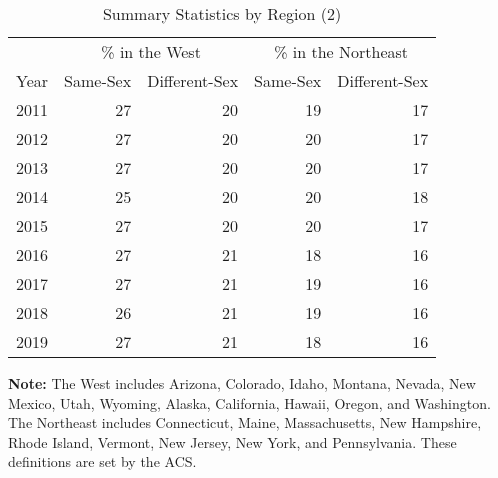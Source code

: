 \begin{table}[htbp]

\caption{Summary Statistics by Region (2)}
\label{region_2} %
\centering
\begin{tabular}[t]{rrrrr}
\toprule
\multicolumn{1}{c}{ } & \multicolumn{2}{c}{\% in the West} & \multicolumn{2}{c}{\% in the Northeast} \\
\cmidrule(l{3pt}r{3pt}){2-3} \cmidrule(l{3pt}r{3pt}){4-5}
Year & Same-Sex & Different-Sex & Same-Sex & Different-Sex\\
\midrule
2011 & 27 & 20 & 19 & 17\\
2012 & 27 & 20 & 20 & 17\\
2013 & 27 & 20 & 20 & 17\\
2014 & 25 & 20 & 20 & 18\\
2015 & 27 & 20 & 20 & 17\\
2016 & 27 & 21 & 18 & 16\\
2017 & 27 & 21 & 19 & 16\\
2018 & 26 & 21 & 19 & 16\\
2019 & 27 & 21 & 18 & 16\\
\bottomrule
\end{tabular}
\vspace{0.5em}
\begin{minipage}{0.85\textwidth} %
\small \textbf{Note:} The West includes Arizona, Colorado, Idaho, Montana, Nevada, New Mexico, Utah, Wyoming, Alaska, California, Hawaii, Oregon, and Washington. The Northeast includes Connecticut, Maine, Massachusetts, New Hampshire, Rhode Island, Vermont, New Jersey, New York, and Pennsylvania. These definitions are set by the ACS.
\end{minipage}
\end{table}
